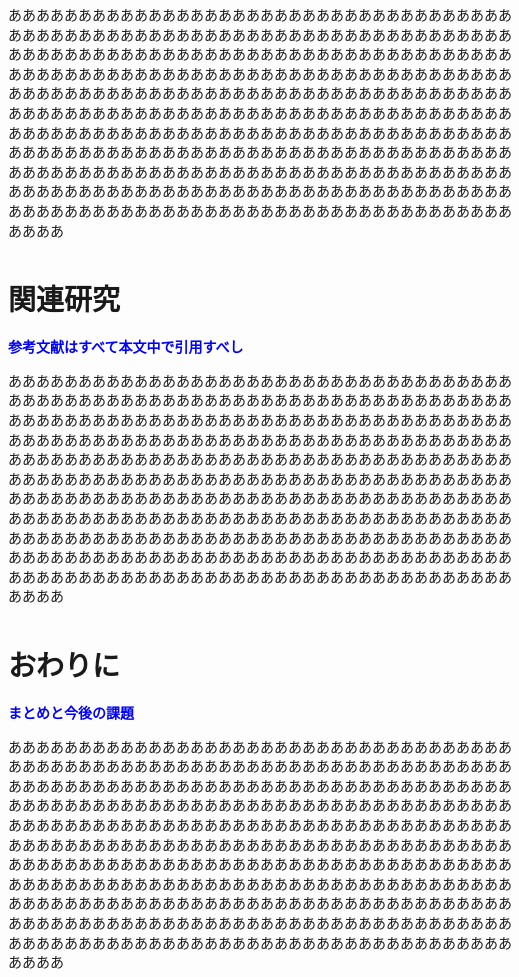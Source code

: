 \documentclass[dvipdfmx]{cs-handout}
\newcommand{\Note}[1]{\noindent \textbf{\textcolor{blue}{#1}}}
\begin{document}
ああああああああああああああああああああああああああああああああああああ
ああああああああああああああああああああああああああああああああああああ
ああああああああああああああああああああああああああああああああああああ
ああああああああああああああああああああああああああああああああああああ
ああああああああああああああああああああああああああああああああああああ
ああああああああああああああああああああああああああああああああああああ
ああああああああああああああああああああああああああああああああああああ
ああああああああああああああああああああああああああああああああああああ
ああああああああああああああああああああああああああああああああああああ
ああああああああああああああああああああああああああああああああああああ
ああああああああああああああああああああああああああああああああああああ
ああああ

\section{関連研究}
\Note{参考文献はすべて本文中で引用すべし}

ああああああああああああああああああああああああああああああああああああ
ああああああああああああああああああああああああああああああああああああ
ああああああああああああああああああああああああああああああああああああ
ああああああああああああああああああああああああああああああああああああ
ああああああああああああああああああああああああああああああああああああ
ああああああああああああああああああああああああああああああああああああ
ああああああああああああああああああああああああああああああああああああ
ああああああああああああああああああああああああああああああああああああ
ああああああああああああああああああああああああああああああああああああ
ああああああああああああああああああああああああああああああああああああ
ああああああああああああああああああああああああああああああああああああ
ああああ

\section{おわりに}
\Note{まとめと今後の課題}

ああああああああああああああああああああああああああああああああああああ
ああああああああああああああああああああああああああああああああああああ
ああああああああああああああああああああああああああああああああああああ
ああああああああああああああああああああああああああああああああああああ
ああああああああああああああああああああああああああああああああああああ
ああああああああああああああああああああああああああああああああああああ
ああああああああああああああああああああああああああああああああああああ
ああああああああああああああああああああああああああああああああああああ
ああああああああああああああああああああああああああああああああああああ
ああああああああああああああああああああああああああああああああああああ
ああああああああああああああああああああああああああああああああああああ
ああああ

%


\end{document}
